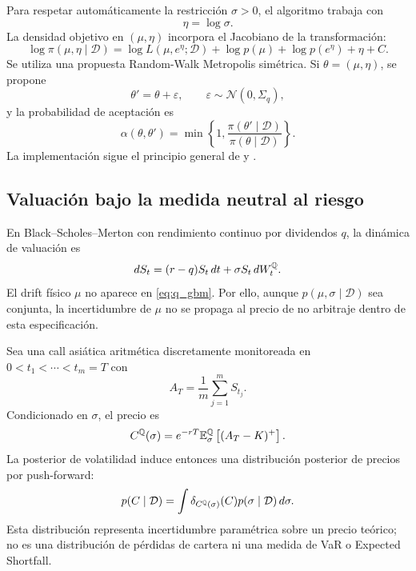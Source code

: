 Para respetar automáticamente la restricción $\sigma>0$, el algoritmo trabaja con
\begin{equation}
 \eta=\log\sigma.
\end{equation}
La densidad objetivo en $(\mu,\eta)$ incorpora el Jacobiano de la transformación:
\begin{equation}
 \log\pi(\mu,\eta\mid\mathcal D)
 =
 \log L(\mu,e^\eta;\mathcal D)
 +\log p(\mu)
 +\log p(e^\eta)
 +\eta + C.
 \label{eq:posterior_eta}
\end{equation}
Se utiliza una propuesta Random-Walk Metropolis simétrica. Si $\theta=(\mu,\eta)$, se propone
\begin{equation}
 \theta'=\theta+\varepsilon,
 \qquad
 \varepsilon\sim\mathcal N(0,\Sigma_q),
\end{equation}
y la probabilidad de aceptación es
\begin{equation}
 \alpha(\theta,\theta')
 =\min\left\{1,
 \frac{\pi(\theta'\mid\mathcal D)}{\pi(\theta\mid\mathcal D)}
 \right\}.
\end{equation}
La implementación sigue el principio general de \citet{metropolis1953} y \citet{hastings1970}.

\subsection{Valuación bajo la medida neutral al riesgo}

En Black--Scholes--Merton con rendimiento continuo por dividendos $q$, la dinámica de valuación es
\begin{equation}
 dS_t=(r-q)S_t\,dt+\sigma S_t\,dW_t^{\mathbb{Q}}.
 \label{eq:q_gbm}
\end{equation}
El drift físico $\mu$ no aparece en \eqref{eq:q_gbm}. Por ello, aunque $p(\mu,\sigma\mid\mathcal D)$ sea conjunta, la incertidumbre de $\mu$ no se propaga al precio de no arbitraje dentro de esta especificación.

Sea una call asiática aritmética discretamente monitoreada en $0<t_1<\cdots<t_m=T$ con
\begin{equation}
 A_T=\frac1m\sum_{j=1}^{m}S_{t_j}.
\end{equation}
Condicionado en $\sigma$, el precio es
\begin{equation}
 C^{\mathbb{Q}}(\sigma)
 =e^{-rT}\mathbb{E}^{\mathbb{Q}}_{\sigma}
 \left[(A_T-K)^+\right].
 \label{eq:cq}
\end{equation}
La posterior de volatilidad induce entonces una distribución posterior de precios por push-forward:
\begin{equation}
 p(C\mid\mathcal D)
 =\int
 \delta_{C^{\mathbb{Q}}(\sigma)}(C)
 p(\sigma\mid\mathcal D)\,d\sigma.
 \label{eq:pushforward}
\end{equation}
Esta distribución representa incertidumbre paramétrica sobre un precio teórico; no es una distribución de pérdidas de cartera ni una medida de VaR o Expected Shortfall.

